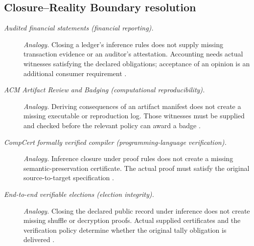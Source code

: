 \subsection*{ Closure--Reality Boundary resolution}
\begingroup\small
\begin{description}
\item[\emph{Audited financial statements (financial reporting).}]
\textit{Analogy.} Closing a ledger's inference rules does not supply missing
transaction evidence or an auditor's attestation. Accounting needs actual
witnesses satisfying the declared obligations; acceptance of an opinion is
an additional consumer requirement \citep{FASB2009ASC}.

\item[\emph{ACM Artifact Review and Badging (computational reproducibility).}]
\textit{Analogy.} Deriving consequences of an artifact manifest does not
create a missing executable or reproduction log. Those witnesses must be
supplied and checked before the relevant policy can award a badge
\citep{ACM2020Artifact}.

\item[\emph{CompCert formally verified compiler (programming-language verification).}]
\textit{Analogy.} Inference closure under proof rules does not create a
missing semantic-preservation certificate. The actual proof must satisfy
the original source-to-target specification \citep{Leroy2009Formal}.

\item[\emph{End-to-end verifiable elections (election integrity).}]
\textit{Analogy.} Closing the declared public record under inference does
not create missing shuffle or decryption proofs. Actual supplied certificates
and the verification policy determine whether the original tally obligation
is delivered \citep{Adida2008Helios}.
\end{description}
\endgroup
